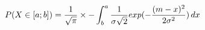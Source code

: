 \documentclass[preview]{standalone}
\begin{document}
\begin{align*}
P( X \in [a;b] ) = { \frac{1}{\sqrt{\pi}} } \times - \int_b^a { { \frac{1}{\sigma \sqrt{2}} } exp(-{ {(m - x)^2} \over {2 \sigma^2} }) } \, dx
\end{align*}
\end{document}
